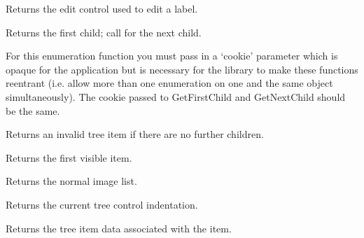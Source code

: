 Returns the edit control used to edit a label.

\label{wxtreectrlgetfirstchild}


Returns the first child; call  for the next child.

For this enumeration function you must pass in a `cookie' parameter
which is opaque for the application but is necessary for the library
to make these functions reentrant (i.e. allow more than one
enumeration on one and the same object simultaneously). The cookie passed to
GetFirstChild and GetNextChild should be the same.

Returns an invalid tree item if there are no further children.




\label{wxtreectrlgetfirstvisibleitem}


Returns the first visible item.

\label{wxtreectrlgetimagelist}


Returns the normal image list.

\label{wxtreectrlgetindent}


Returns the current tree control indentation.

\label{wxtreectrlgetitemdata}


Returns the tree item data associated with the item.




